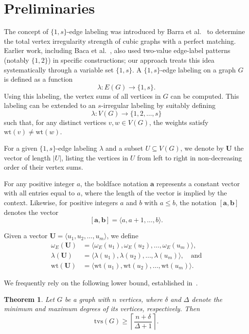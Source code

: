 \documentclass[11pt]{article}
\newtheorem{thm}{Theorem}[section]
\numberwithin{equation}{section}
\begin{document}
\section{Preliminaries}
The concept of \(\{1,s\}\)-edge labeling was introduced by Barra et al.~\cite{barraTotalVertexIrregularity2025a} to determine the total vertex irregularity strength of cubic graphs with a perfect matching. Earlier work, including Baca et al.~\cite{bacaIrregularTotalLabellings2007}, also used two-value edge-label patterns (notably \(\{1,2\}\)) in specific constructions; our approach treats this idea systematically through a variable set \(\{1,s\}\). A \(\{1,s\}\)-edge labeling on a graph \(G\) is defined as a function
\[
\lambda: E(G) \to \{1, s\}.
\]
Using this labeling, the vertex sums of all vertices in \(G\) can be computed. This labeling can be extended to an \(s\)-irregular labeling by suitably defining
\[
\lambda: V(G) \to \{1, 2, \ldots, s\}
\]
such that, for any distinct vertices \(v, w \in V(G)\), the weights satisfy \(\mathrm{wt}(v) \neq \mathrm{wt}(w)\).

For a given \(\{1,s\}\)-edge labeling \(\lambda\) and a subset \(U \subseteq V(G)\), we denote by \(\mathbf{U}\) the vector of length \(|U|\), listing the vertices in \(U\) from left to right in non-decreasing order of their vertex sums.

For any positive integer \(a\), the boldface notation \(\mathbf{a}\) represents a constant vector with all entries equal to \(a\), where the length of the vector is implied by the context. Likewise, for positive integers \(a\) and \(b\) with \(a \leq b\), the notation \(\mathbf{[a,b]}\) denotes the vector
\[
\mathbf{[a,b]} = \langle a, a+1, \ldots, b \rangle.
\]

Given a vector \(\mathbf{U} = \langle u_1, u_2, \ldots, u_m \rangle\), we define
\begin{align*}
\omega_E(\mathbf{U}) &= \langle \omega_E(u_1), \omega_E(u_2), \ldots, \omega_E(u_m) \rangle, \\
\lambda(\mathbf{U}) &= \langle \lambda(u_1), \lambda(u_2), \ldots, \lambda(u_m) \rangle, \quad \text{and} \\
\mathrm{wt}(\mathbf{U}) &= \langle \mathrm{wt}(u_1), \mathrm{wt}(u_2), \ldots, \mathrm{wt}(u_m) \rangle.
\end{align*}

We frequently rely on the following lower bound, established in~\cite{bacaIrregularTotalLabellings2007}.

\begin{thm}
Let \(G\) be a graph with \(n\) vertices, where \(\delta\) and \(\Delta\) denote the minimum and maximum degrees of its vertices, respectively. Then
\begin{equation}\label{lbound}
\mathrm{tvs}(G) \geq \left\lceil \frac{n + \delta}{\Delta + 1} \right\rceil.
\end{equation}
\end{thm}
\end{document}
